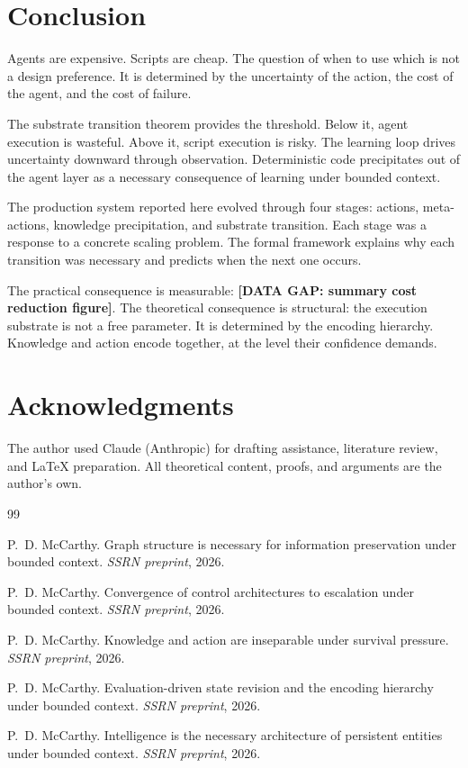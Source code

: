 \documentclass[11pt]{article}
\theoremstyle{definition}
\begin{document}
\section{Conclusion}
\label{sec:conclusion}

Agents are expensive. Scripts are cheap. The question of when to use
which is not a design preference. It is determined by the uncertainty
of the action, the cost of the agent, and the cost of failure.

The substrate transition theorem provides the threshold. Below it,
agent execution is wasteful. Above it, script execution is risky. The
learning loop drives uncertainty downward through observation.
Deterministic code precipitates out of the agent layer as a necessary
consequence of learning under bounded context.

The production system reported here evolved through four stages:
actions, meta-actions, knowledge precipitation, and substrate
transition. Each stage was a response to a concrete scaling problem.
The formal framework explains why each transition was necessary and
predicts when the next one occurs.

The practical consequence is measurable: \textbf{[DATA GAP: summary
cost reduction figure]}. The theoretical consequence is structural:
the execution substrate is not a free parameter. It is determined by
the encoding hierarchy. Knowledge and action encode together, at the
level their confidence demands.

\section*{Acknowledgments}

The author used Claude (Anthropic) for drafting assistance, literature
review, and \LaTeX{} preparation. All theoretical content, proofs, and
arguments are the author's own.


\begin{thebibliography}{99}

P.~D. McCarthy.
\newblock Graph structure is necessary for information preservation
under bounded context.
\newblock \emph{SSRN preprint}, 2026.

P.~D. McCarthy.
\newblock Convergence of control architectures to escalation under bounded context.
\newblock \emph{SSRN preprint}, 2026.

P.~D. McCarthy.
\newblock Knowledge and action are inseparable under survival pressure.
\newblock \emph{SSRN preprint}, 2026.

P.~D. McCarthy.
\newblock Evaluation-driven state revision and the encoding hierarchy
  under bounded context.
\newblock \emph{SSRN preprint}, 2026.

P.~D. McCarthy.
\newblock Intelligence is the necessary architecture of persistent
entities under bounded context.
\newblock \emph{SSRN preprint}, 2026.

\end{thebibliography}
\end{document}
